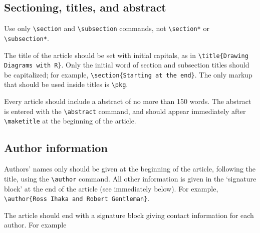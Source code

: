 \subsection{Sectioning, titles, and abstract}

Use only \verb|\section| and \verb|\subsection| commands, not
\verb|\section*| or \verb|\subsection*|.

The title of the article should be set with initial capitals, as in
\verb|\title{Drawing Diagrams with R}|. Only the initial word of
section and subsection titles should be capitalized; for example,
\verb|\section{Starting at the end}|. The only markup that should be
used inside titles is \verb|\pkg|.

Every article should include a abstract of no more than 150 words. The abstract
is entered with the \verb|\abstract| command, and should appear immediately
after \verb|\maketitle| at the beginning of the article.

\subsection{Author information}

Authors' names only should be given at the beginning of the article, following the
title, using the \verb|\author| command. All other information is given in the
`signature block' at the end of the article (see immediately below). For example,
\verb|\author{Ross Ihaka and Robert Gentleman}|.

The article should end with a signature block giving contact information
for each author. For example

